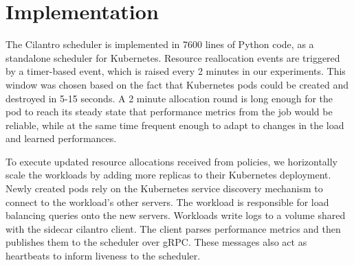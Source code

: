 
\section{Implementation}
\label{sec:implementation}




The Cilantro scheduler %
is implemented in 7600 lines of Python code,
as a standalone scheduler for Kubernetes. 
Resource reallocation events are triggered by a timer-based event, which is raised every 2 minutes
in our experiments.
This window was chosen based on the fact that Kubernetes pods could be created and destroyed in
5-15 seconds.
A 2 minute allocation round is long enough for the pod to reach its steady state that performance
metrics from the job would be reliable, while at the same time frequent enough to adapt to changes in
the load and learned performances. %

To execute updated resource allocations received from policies, we horizontally
scale the workloads by adding more replicas to their Kubernetes deployment. Newly created pods
rely on the Kubernetes service discovery mechanism to connect to the workload's other servers. The
workload is responsible for load balancing queries onto the new servers. 
Workloads write logs to a volume shared with the sidecar cilantro client. 
The client parses performance metrics and then publishes them to the scheduler over gRPC.
These messages also act as heartbeats to inform liveness to the scheduler.

